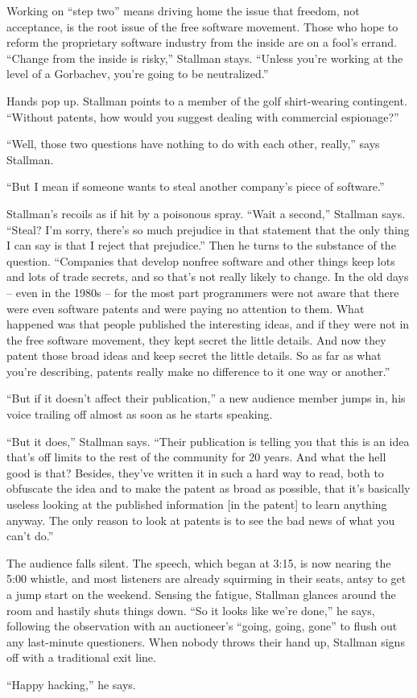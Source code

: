Working on ``step two'' means driving home the issue that freedom, not acceptance, is the root issue of the free software movement. Those who hope to reform the proprietary software industry from the inside are on a fool's errand. ``Change from the inside is risky,'' Stallman stays. ``Unless you're working at the level of a Gorbachev, you're going to be neutralized.''

Hands pop up. Stallman points to a member of the golf shirt-wearing contingent. ``Without patents, how would you suggest dealing with commercial espionage?''

``Well, those two questions have nothing to do with each other, really,'' says Stallman.

``But I mean if someone wants to steal another company's piece of software.''

Stallman's recoils as if hit by a poisonous spray. ``Wait a second,'' Stallman says. ``Steal? I'm sorry, there's so much prejudice in that statement that the only thing I can say is that I reject that prejudice.'' Then he turns to the substance of the question. ``Companies that develop nonfree software and other things keep lots and lots of trade secrets, and so that's not really likely to change. In the old days -- even in the 1980s -- for the most part programmers were not aware that there were even software patents and were paying no attention to them. What happened was that people published the interesting ideas, and if they were not in the free software movement, they kept secret the little details. And now they patent those broad ideas and keep secret the little details. So as far as what you're describing, patents really make no difference to it one way or another.''

``But if it doesn't affect their publication,'' a new audience member jumps in, his voice trailing off almost as soon as he starts speaking.

``But it does,'' Stallman says. ``Their publication is telling you that this is an idea that's off limits to the rest of the community for 20 years. And what the hell good is that? Besides, they've written it in such a hard way to read, both to obfuscate the idea and to make the patent as broad as possible, that it's basically useless looking at the published information [in the patent] to learn anything anyway. The only reason to look at patents is to see the bad news of what you can't do.''

The audience falls silent. The speech, which began at 3:15, is now nearing the 5:00 whistle, and most listeners are already squirming in their seats, antsy to get a jump start on the weekend. Sensing the fatigue, Stallman glances around the room and hastily shuts things down. ``So it looks like we're done,'' he says, following the observation with an auctioneer's ``going, going, gone'' to flush out any last-minute questioners. When nobody throws their hand up, Stallman signs off with a traditional exit line.

``Happy hacking,'' he says.

\theendnotes
\setcounter{endnote}{0}
